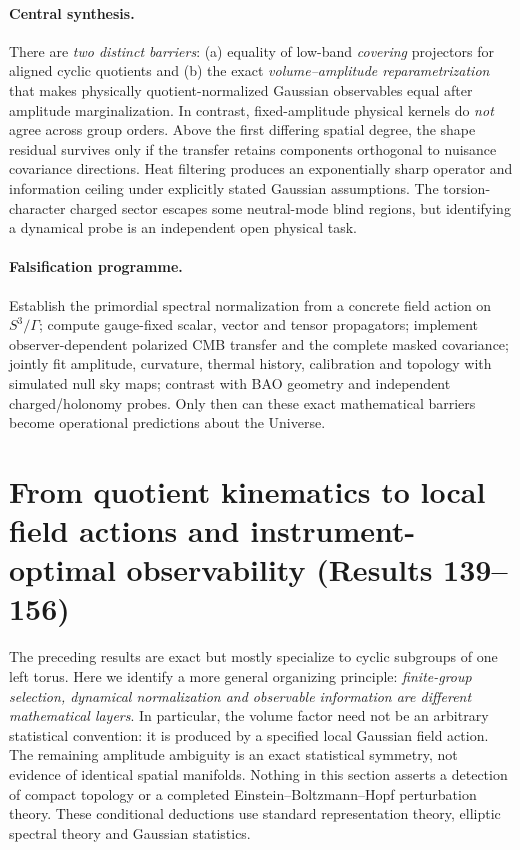 \documentclass[aps,prd,onecolumn,notitlepage,groupedaddress,11pt]{revtex4-2}
\begin{document}
\paragraph{Central synthesis.}
There are \emph{two distinct barriers}: (a) equality of low-band \emph{covering} projectors for aligned cyclic quotients and (b) the exact \emph{volume--amplitude reparametrization} that makes physically quotient-normalized Gaussian observables equal after amplitude marginalization. In contrast, fixed-amplitude physical kernels do \emph{not} agree across group orders. Above the first differing spatial degree, the shape residual survives only if the transfer retains components orthogonal to nuisance covariance directions. Heat filtering produces an exponentially sharp operator and information ceiling under explicitly stated Gaussian assumptions. The torsion-character charged sector escapes some neutral-mode blind regions, but identifying a dynamical probe is an independent open physical task.

\paragraph{Falsification programme.} Establish the primordial spectral normalization from a concrete field action on $S^3/\Gamma$; compute gauge-fixed scalar, vector and tensor propagators; implement observer-dependent polarized CMB transfer and the complete masked covariance; jointly fit amplitude, curvature, thermal history, calibration and topology with simulated null sky maps; contrast with BAO geometry and independent charged/holonomy probes. Only then can these exact mathematical barriers become operational predictions about the Universe.

\section{From quotient kinematics to local field actions and instrument-optimal observability (Results 139--156)}
\label{sec:general_group_observability}
The preceding results are exact but mostly specialize to cyclic subgroups of one left torus. Here we identify a more general organizing principle: \emph{finite-group selection, dynamical normalization and observable information are different mathematical layers}. In particular, the volume factor need not be an arbitrary statistical convention: it is produced by a specified local Gaussian field action. The remaining amplitude ambiguity is an exact statistical symmetry, not evidence of identical spatial manifolds. Nothing in this section asserts a detection of compact topology or a completed Einstein--Boltzmann--Hopf perturbation theory. These conditional deductions use standard representation theory, elliptic spectral theory and Gaussian statistics.
\end{document}

